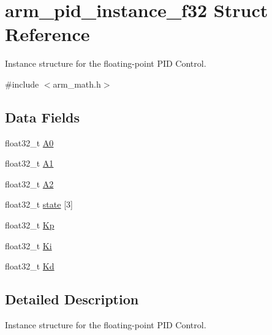 \hypertarget{structarm__pid__instance__f32}{\section{arm\-\_\-pid\-\_\-instance\-\_\-f32 Struct Reference}
\label{structarm__pid__instance__f32}
}


Instance structure for the floating-\/point P\-I\-D Control.  




{\ttfamily \#include $<$arm\-\_\-math.\-h$>$}

\subsection*{Data Fields}
\begin{DoxyCompactItemize}
\item 
float32\-\_\-t \hyperlink{structarm__pid__instance__f32_afc2ed2bf70b7d9d84f49ee9ae7caa004}{A0}
\item 
float32\-\_\-t \hyperlink{structarm__pid__instance__f32_a5e6785a3a5cf7b98f3bfc7b180d98273}{A1}
\item 
float32\-\_\-t \hyperlink{structarm__pid__instance__f32_a5b00947275caf079f351271bf41573fe}{A2}
\item 
float32\-\_\-t \hyperlink{structarm__pid__instance__f32_a473556ac6100fc188e77930d56f51062}{state} \mbox{[}3\mbox{]}
\item 
float32\-\_\-t \hyperlink{structarm__pid__instance__f32_abe23f3e122ef5f55398fcf77c793c425}{Kp}
\item 
float32\-\_\-t \hyperlink{structarm__pid__instance__f32_ad1a1aa1c10a2dca201a3422f82198777}{Ki}
\item 
float32\-\_\-t \hyperlink{structarm__pid__instance__f32_ace6b9e405a991cbaf6b4c137ca0d51a3}{Kd}
\end{DoxyCompactItemize}


\subsection{Detailed Description}
Instance structure for the floating-\/point P\-I\-D Control. 

